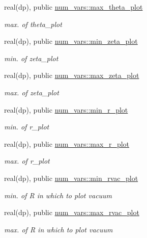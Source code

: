 \begin{DoxyCompactItemize}
real(dp), public \hyperlink{namespacenum__vars_ade6d14ac98ba7f573ef83194808f68b8}{num\+\_\+vars\+::max\+\_\+theta\+\_\+plot}
\begin{DoxyCompactList}\small\item\em max. of {\ttfamily theta\+\_\+plot} \end{DoxyCompactList}\item 
real(dp), public \hyperlink{namespacenum__vars_a773a55cfd780f1f9db69887fdf48b0a5}{num\+\_\+vars\+::min\+\_\+zeta\+\_\+plot}
\begin{DoxyCompactList}\small\item\em min. of {\ttfamily zeta\+\_\+plot} \end{DoxyCompactList}\item 
real(dp), public \hyperlink{namespacenum__vars_a2c2f75ebac91c6e5e122e41a62b71b6d}{num\+\_\+vars\+::max\+\_\+zeta\+\_\+plot}
\begin{DoxyCompactList}\small\item\em max. of {\ttfamily zeta\+\_\+plot} \end{DoxyCompactList}\item 
real(dp), public \hyperlink{namespacenum__vars_ab3369f21aa4433cb6dc08957e477c015}{num\+\_\+vars\+::min\+\_\+r\+\_\+plot}
\begin{DoxyCompactList}\small\item\em min. of {\ttfamily r\+\_\+plot} \end{DoxyCompactList}\item 
real(dp), public \hyperlink{namespacenum__vars_a1f9d7347043448d30c6612558ae569e5}{num\+\_\+vars\+::max\+\_\+r\+\_\+plot}
\begin{DoxyCompactList}\small\item\em max. of {\ttfamily r\+\_\+plot} \end{DoxyCompactList}\item 
real(dp), public \hyperlink{namespacenum__vars_a9f2ea40c94edef5e9f10f3b5d154c2a3}{num\+\_\+vars\+::min\+\_\+rvac\+\_\+plot}
\begin{DoxyCompactList}\small\item\em min. of {\ttfamily R} in which to plot vacuum \end{DoxyCompactList}\item 
real(dp), public \hyperlink{namespacenum__vars_a6b703d539ded323851dce024a4b33df7}{num\+\_\+vars\+::max\+\_\+rvac\+\_\+plot}
\begin{DoxyCompactList}\small\item\em max. of {\ttfamily R} in which to plot vacuum \end{DoxyCompactList}\item 

\end{DoxyCompactItemize}
